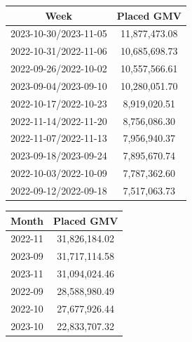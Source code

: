 \documentclass{article}
\begin{document}
\begin{tcolorbox}[colback=green!5!white, colframe=green!75!black, fonttitle=\bfseries, title=Peak Sales Periods by weeks and months]

    \vspace{0.5cm}

    \centering
    \begin{tabular}{|c|c|}
    \hline
    \textbf{Week} & \textbf{Placed GMV} \\ \hline
    2023-10-30/2023-11-05 & 11,877,473.08 \\ \hline
    2022-10-31/2022-11-06 & 10,685,698.73 \\ \hline
    2022-09-26/2022-10-02 & 10,557,566.61 \\ \hline
    2023-09-04/2023-09-10 & 10,280,051.70 \\ \hline
    2022-10-17/2022-10-23 & 8,919,020.51 \\ \hline
    2022-11-14/2022-11-20 & 8,756,086.30 \\ \hline
    2022-11-07/2022-11-13 & 7,956,940.37 \\ \hline
    2023-09-18/2023-09-24 & 7,895,670.74 \\ \hline
    2022-10-03/2022-10-09 & 7,787,362.60 \\ \hline
    2022-09-12/2022-09-18 & 7,517,063.73 \\ \hline
    \end{tabular}

    \vspace{0.5cm}

    \centering
    \begin{tabular}{|c|c|}
    \hline
    \textbf{Month} & \textbf{Placed GMV} \\ \hline
    2022-11 & 31,826,184.02 \\ \hline
    2023-09 & 31,717,114.58 \\ \hline
    2023-11 & 31,094,024.46 \\ \hline
    2022-09 & 28,588,980.49 \\ \hline
    2022-10 & 27,677,926.44 \\ \hline
    2023-10 & 22,833,707.32 \\ \hline
    \end{tabular}

    \vspace{0.5cm}

\end{tcolorbox}
\end{document}
